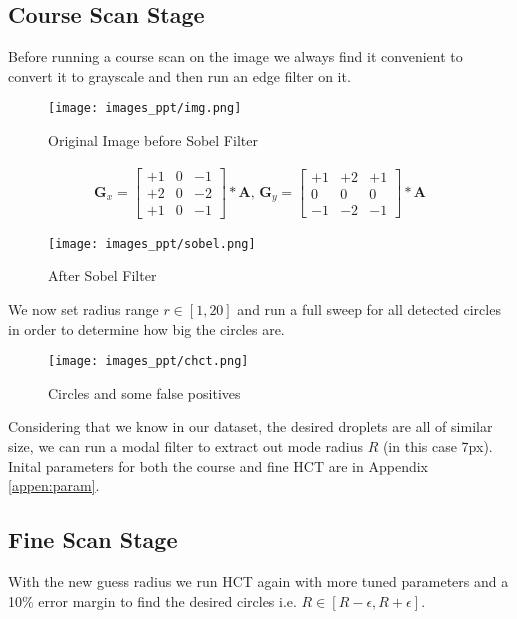 \documentclass[hidelinks]{book}
\numberwithin{equation}{section}
\begin{document}
\subsection{Course Scan Stage}\label{ssec:coarse}
Before running a course scan on the image we always find it convenient to convert it to grayscale and then run an edge filter on it.

\begin{figure}[H]
  \centering
  \texttt{[image: images\_ppt/img.png]}
  \caption{Original Image before Sobel Filter}
\end{figure}
\begin{align*}
\mathbf{G}_x =\begin{bmatrix}
+1&0&-1\\+2&0&-2\\+1&0&-1
\end{bmatrix}*\mathbf {A} ,\,
\mathbf{G}_y =\begin{bmatrix}
+1&+2&+1\\0&0&0\\-1&-2&-1
\end{bmatrix}*\mathbf {A}
\end{align*}
%
\begin{figure}[H]
  \centering
  \texttt{[image: images\_ppt/sobel.png]}
  \caption{After Sobel Filter}
\end{figure}

We now set radius range $r\in [1, 20]$ and run a full sweep for all detected circles in order to determine how big the circles are.

\begin{figure}[H]
  \centering
  \texttt{[image: images\_ppt/chct.png]}
  \caption{Circles and some false positives}
\end{figure}

Considering that we know in our dataset, the desired droplets are all of similar size, we can run a modal filter to extract out mode radius $R$ (in this case 7px). Inital parameters for both the course and fine HCT are in Appendix \ref{appen:param}.

\subsection{Fine Scan Stage}\label{ssec:fine}
With the new guess radius we run HCT again with more tuned parameters and a 10\% error margin to find the desired circles i.e. $R\in [R-\epsilon, R+\epsilon]$.
\end{document}
